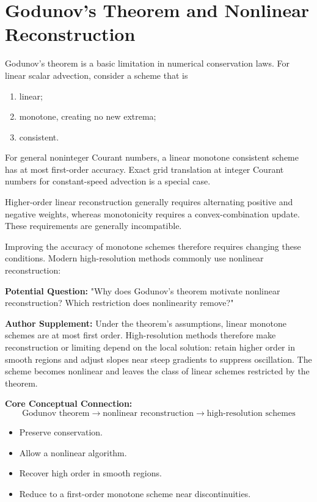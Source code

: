 \section{Godunov's Theorem and Nonlinear Reconstruction}
Godunov's theorem is a basic limitation in numerical conservation laws. For linear scalar advection, consider a scheme that is

\begin{enumerate}
  \item linear;
  \item monotone, creating no new extrema;
  \item consistent.
\end{enumerate}

For general noninteger Courant numbers, a linear monotone consistent scheme has at most first-order accuracy. Exact grid translation at integer Courant numbers for constant-speed advection is a special case.

Higher-order linear reconstruction generally requires alternating positive and negative weights, whereas monotonicity requires a convex-combination update. These requirements are generally incompatible.

Improving the accuracy of monotone schemes therefore requires changing these conditions. Modern high-resolution methods commonly use nonlinear reconstruction:

\begin{authornote}
\textbf{Potential Question:}
"Why does Godunov's theorem motivate nonlinear reconstruction? Which restriction does nonlinearity remove?"

\textbf{Author Supplement:}
Under the theorem's assumptions, linear monotone schemes are at most first order. High-resolution methods therefore make reconstruction or limiting depend on the local solution: retain higher order in smooth regions and adjust slopes near steep gradients to suppress oscillation. The scheme becomes nonlinear and leaves the class of linear schemes restricted by the theorem.

\textbf{Core Conceptual Connection:}
\[
\text{Godunov theorem}
\longrightarrow
\text{nonlinear reconstruction}
\longrightarrow
\text{high-resolution schemes}
\]
\end{authornote}

\begin{itemize}
  \item Preserve conservation.
  \item Allow a nonlinear algorithm.
  \item Recover high order in smooth regions.
  \item Reduce to a first-order monotone scheme near discontinuities.
\end{itemize}

